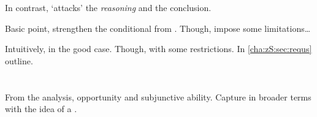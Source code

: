 \begin{note}
  In contrast, \requ{} `attacks' the \emph{reasoning} and the conclusion.
\end{note}

\begin{note}
  Basic point, strengthen the conditional from .
  Though, impose some limitations\dots

  Intuitively, \fc{} in the good case.
  Though, with some restrictions.
  In \autoref{cha:zS:sec:requs} outline.
\end{note}

\section{}
\label{cha:zS:sec:requs}

\begin{note}
  \color{red}
  From the analysis, opportunity and subjunctive ability.
  Capture in broader terms with the idea of a \requ{}.
\end{note}

